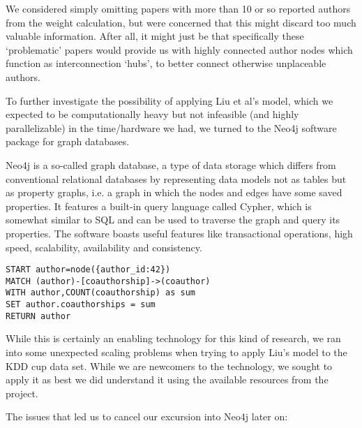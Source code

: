 We considered simply omitting papers with more than 10 or so reported authors from the weight calculation, but were concerned that this might discard too much valuable information.
After all, it might just be that specifically these `problematic' papers would provide us with highly connected author nodes which function as interconnection `hubs', to better connect otherwise unplaceable authors.

To further investigate the possibility of applying Liu et al's model, which we expected to be computationally heavy but not infeasible (and highly parallelizable) in the time/hardware we had, we turned to the Neo4j software package for graph databases.

Neo4j is a so-called graph database, a type of data storage which differs from conventional relational databases by representing data models not as tables but as property graphs, i.e. a graph in which the nodes and edges have some saved properties.
It features a built-in query language called Cypher, which is somewhat similar to SQL and can be used to traverse the graph and query its properties.
The software boasts useful features like transactional operations, high speed, scalability, availability and consistency.

\begin{verbatim}
START author=node({author_id:42})
MATCH (author)-[coauthorship]->(coauthor)
WITH author,COUNT(coauthorship) as sum
SET author.coauthorships = sum
RETURN author
\end{verbatim}

While this is certainly an enabling technology for this kind of research, we ran into some unexpected scaling problems when trying to apply Liu's model to the KDD cup data set.
While we are newcomers to the technology, we sought to apply it as best we did understand it using the available resources from the project.

The issues that led us to cancel our excursion into Neo4j later on:

